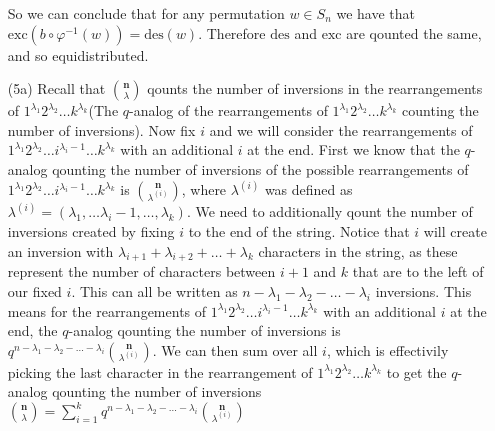 \documentclass[12pt]{amsart}
\theoremstyle{definition}
\begin{document}
\begin{itemize}
So we can conclude that for any permutation $w\in S_n$ we have that $\text{exc}(b\circ\varphi^{-1}(w))=\text{des}(w)$. Therefore $\text{des}$ and $\text{exc}$ are qounted the same, and so equidistributed.\\


\item[(5a)]
Recall that ${\textbf{n}\choose \lambda}$ qounts the number of inversions in the rearrangements of $1^{\lambda_{1}}2^{\lambda_{2}}\dots k^{\lambda_{k}}$(The $q$-analog of the rearrangements of $1^{\lambda_{1}}2^{\lambda_{2}}\dots k^{\lambda_{k}}$ counting the number of inversions). Now fix $i$ and we will consider the rearrangements of $1^{\lambda_{1}}2^{\lambda_{2}}\dots i^{\lambda_i-1}\dots k^{\lambda_{k}}$ with an additional $i$ at the end. First we know that the $q$-analog qounting the number of inversions of the possible rearrangements of $1^{\lambda_{1}}2^{\lambda_{2}}\dots i^{\lambda_i-1}\dots k^{\lambda_{k}}$ is ${\textbf{n}\choose \lambda^{(i)}}$, where $\lambda^{(i)}$ was defined as $\lambda^{(i)}=(\lambda_1,\dots\lambda_i-1,\dots,\lambda_k)$. We need to additionally qount the number of inversions created by fixing $i$ to the end of the string. Notice that $i$ will create an inversion with $\lambda_{i+1}+\lambda_{i+2}+\dots+\lambda_{k}$ characters in the string, as these represent the number of characters between $i+1$ and $k$ that are to the left of our fixed $i$. This can all be written as $n-\lambda_1-\lambda_2-\dots-\lambda_i$ inversions. This means for the rearrangements of $1^{\lambda_{1}}2^{\lambda_{2}}\dots i^{\lambda_i-1}\dots k^{\lambda_{k}}$ with an additional $i$ at the end, the $q$-analog qounting the number of inversions is $q^{n-\lambda_1-\lambda_2-\dots-\lambda_i}{\textbf{n}\choose \lambda^{(i)}}$. We can then sum over all $i$, which is effectivily picking the last character in the rearrangement of $1^{\lambda_{1}}2^{\lambda_{2}}\dots k^{\lambda_{k}}$ to get the $q$-analog qounting the number of inversions ${\textbf{n}\choose \lambda}=\sum_{i=1}^k q^{n-\lambda_1-\lambda_2-\dots-\lambda_i}{\textbf{n}\choose \lambda^{(i)}}$

\end{itemize}
\end{document}
